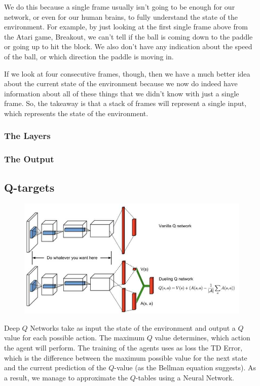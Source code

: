 We do this because a single frame usually isn't going to be enough for our network, 
or even for our human brains, to fully understand the state of the environment. For 
example, by just looking at the first single frame above from the Atari game, 
Breakout, we can't tell if the ball is coming down to the paddle or going up to hit 
the block. We also don't have any indication about the speed of the ball, or which 
direction the paddle is moving in.

If we look at four consecutive frames, though, then we have a much better idea about 
the current state of the environment because we now do indeed have information about 
all of these things that we didn't know with just a single frame. So, the takeaway 
is that a stack of frames will represent a single input, which represents the state 
of the environment.


\subsubsection{The Layers}


\subsubsection{The Output}


\subsection{Q-targets}

\begin{figure}[h]
\centering
\includegraphics[scale=0.5]{pix/q_learning/DDQN.jpg}
\end{figure}

Deep $Q$ Networks take as input the state of the environment and output a $Q$ value for 
each possible action. The maximum $Q$ value determines, which action the agent will 
perform. The training of the agents uses as loss the TD Error, which is the difference 
between the maximum possible value for the next state and the current prediction of the 
$Q$-value (as the Bellman equation suggests). As a result, we manage to approximate the
$Q$-tables using a Neural Network.

